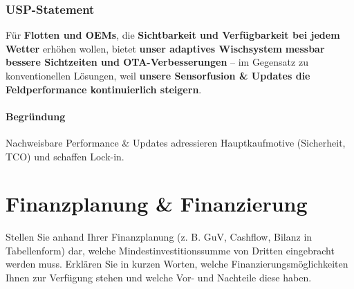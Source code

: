 \documentclass[
%
ngerman %
%
numeric %
]{wbh-assignment}
\begin{document}
\subsubsection{USP-Statement}
Für \textbf{Flotten und OEMs}, die \textbf{Sichtbarkeit und Verfügbarkeit bei jedem Wetter} erhöhen wollen, bietet \textbf{unser adaptives Wischsystem} \textbf{messbar bessere Sichtzeiten und OTA-Verbesserungen} – im Gegensatz zu konventionellen Lösungen, weil \textbf{unsere Sensorfusion \& Updates die Feldperformance kontinuierlich steigern}.

\paragraph{Begründung}
Nachweisbare Performance \& Updates adressieren Hauptkaufmotive (Sicherheit, TCO) und schaffen Lock-in.

\clearpage

\section{Finanzplanung \& Finanzierung}
\label{sec:4}

\begin{aufgabenstellung}
Stellen Sie anhand Ihrer Finanzplanung (z. B. GuV, Cashflow, Bilanz in Tabellenform) dar, welche Mindestinvestitionssumme von Dritten eingebracht werden muss.
Erklären Sie in kurzen Worten, welche Finanzierungsmöglichkeiten Ihnen zur Verfügung stehen und welche Vor- und Nachteile diese haben.
\end{aufgabenstellung}

\vspace*{5mm}
\end{document}
